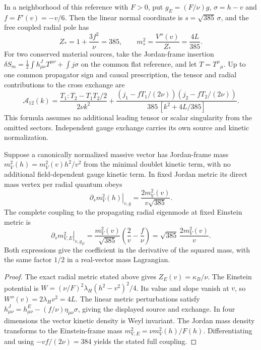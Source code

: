 \documentclass[11pt,a4paper]{article}
\begin{document}
\begin{proposition}
\label{p3g:prop:v3041-centered-radial-pole}
In a neighborhood of this reference with \(F>0\), put
\(g_E=(F/\nu)g\), \(\sigma=h-v\) and \(f=F'(v)=-v/6\).
Then the linear normal coordinate is \(s=\sqrt{385}\,\sigma\), and the
free coupled radial pole has
\[
 Z_* = 1+\frac{3f^2}{\nu}=385,\qquad
 m_s^2=\frac{V''(v)}{Z_*}=\frac{4L}{385}.
\]
For two conserved material sources, take the Jordan-frame insertion
\(\delta S_m=\tfrac12\int h^J_{\mu\nu}T^{\mu\nu}+\int j\sigma\)
on the common flat reference, and let \(T={T^\mu}_\mu\).
Up to one common propagator sign and causal prescription, the tensor and
radial contributions to the cross exchange are
\[
 \mathcal A_{12}(k)=
 \frac{T_1:T_2-T_1T_2/2}{2\nu k^2}
 +\frac{(j_1-fT_1/(2\nu))(j_2-fT_2/(2\nu))}
 {385\,[k^2+4L/385]} .
\]
This formula assumes no additional leading tensor or scalar singularity
from the omitted sectors. Independent gauge exchange carries its own
source and kinetic normalization.

Suppose a canonically normalized massive vector has Jordan-frame mass
\(m_V^2(h)=m_V^2(v)h^2/v^2\) from the minimal doublet kinetic term,
with no additional field-dependent gauge kinetic term.
In fixed Jordan metric its direct mass vertex per radial quantum obeys
\[
 \left.\partial_s m_V^2(h)\right|_{v,g}
     =\frac{2m_V^2(v)}{v\sqrt{385}}.
\]
The complete coupling to the propagating radial eigenmode at fixed
Einstein metric is
\[
 \left.\partial_s m_{V,E}^2\right|_{v,g_E}
 =\frac{m_V^2(v)}{\sqrt{385}}\left(\frac{2}{v}-\frac f\nu\right)
 =\sqrt{385}\,\frac{2m_V^2(v)}{v}.
\]
Both expressions give the coefficient in the derivative of the squared
mass, with the same factor \(1/2\) in a real-vector mass Lagrangian.
\end{proposition}
\begin{proof}
The exact radial metric stated above gives \(Z_E(v)=\kappa_B/\nu\).
The Einstein potential is
\(W=(\nu/F)^2\lambda_H(h^2-v^2)^2/4\).
Its value and slope vanish at \(v\), so \(W''(v)=2\lambda_Hv^2=4L\).
The linear metric perturbations satisfy
\(h^J_{\mu\nu}=h^E_{\mu\nu}-(f/\nu)\eta_{\mu\nu}\sigma\), giving the
displayed source and exchange. In four dimensions the vector kinetic
density is Weyl invariant. The Jordan mass density transforms to the
Einstein-frame mass \(m_{V,E}^2=\nu m_V^2(h)/F(h)\). Differentiating
and using \(-vf/(2\nu)=384\) yields the stated full coupling.
\end{proof}
\end{document}
